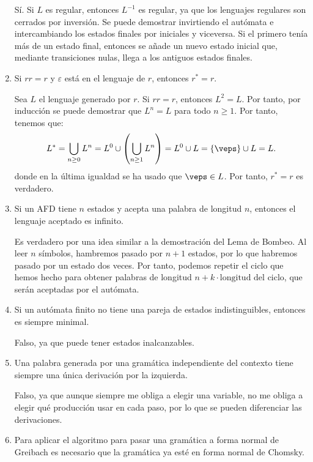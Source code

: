 \documentclass[12pt]{article}
\begin{document}
\begin{ejercicio}[2.5 puntos]
\begin{enumerate}
            Sí. Si $L$ es regular, entonces $L^{-1}$ es regular, ya que los lenguajes regulares son cerrados por inversión. Se puede demostrar invirtiendo el autómata e intercambiando los estados finales por iniciales y viceversa. Si el primero tenía más de un estado final, entonces se añade un nuevo estado inicial que, mediante transiciones nulas, llega a los antiguos estados finales.
            \item Si $rr = r$ y $\varepsilon$ está en el lenguaje de $r$, entonces $r^* = r$.
            
            Sea $L$ el lenguaje generado por $r$. Si $rr=r$, entonces $L^2=L$. Por tanto, por inducción se puede demostrar que $L^n=L$ para todo $n\geq 1$. Por tanto, tenemos que:
            \begin{equation*}
                L^*=\bigcup_{n\geq 0}L^n= L^0\cup \left(\bigcup_{n\geq 1}L^n\right)=L^0\cup L=\{\veps\}\cup L=L.
            \end{equation*}
            donde en la última igualdad se ha usado que $\veps\in L$. Por tanto, $r^*=r$ es verdadero.
            \item Si un AFD tiene $n$ estados y acepta una palabra de longitud $n$, entonces el lenguaje aceptado es infinito.
            
            Es verdadero por una idea similar a la demostración del Lema de Bombeo. Al leer $n$ símbolos, hambremos pasado por $n+1$ estados, por lo que habremos pasado por un estado dos veces. Por tanto, podemos repetir el ciclo que hemos hecho para obtener palabras de longitud $n+k\cdot \text{longitud del ciclo}$, que serán aceptadas por el autómata.
            \item Si un autómata finito no tiene una pareja de estados indistinguibles, entonces es siempre minimal.
            
            Falso, ya que puede tener estados inalcanzables.
            \item Una palabra generada por una gramática independiente del contexto tiene siempre una única derivación por la izquierda.
            
            Falso, ya que aunque siempre me obliga a elegir una variable, no me obliga a elegir qué producción usar en cada paso, por lo que se pueden diferenciar las derivaciones.
            \item Para aplicar el algoritmo para pasar una gramática a forma normal de Greibach es necesario que la gramática ya esté en forma normal de Chomsky.
            

\end{enumerate}
\end{ejercicio}
\end{document}
